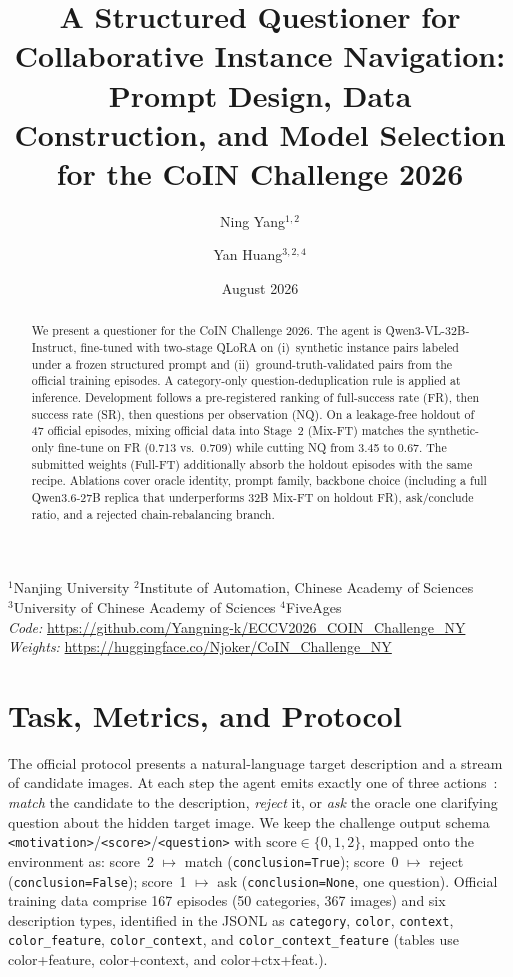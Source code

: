 \documentclass[10pt,a4paper]{article}
\title{A Structured Questioner for Collaborative Instance Navigation:\\
Prompt Design, Data Construction, and Model Selection\\
for the CoIN Challenge 2026}
\author{Ning Yang$^{1,2}$ \and Yan Huang$^{3,2,4}$}
\date{August 2026}
\begin{document}
\maketitle
\begin{center}
{\small
$^{1}$Nanjing University \quad
$^{2}$Institute of Automation, Chinese Academy of Sciences\\
$^{3}$University of Chinese Academy of Sciences \quad
$^{4}$FiveAges}\\[0.45em]
\textit{Code:}
\url{https://github.com/Yangning-k/ECCV2026_COIN_Challenge_NY}\\[0.12em]
\textit{Weights:}
\url{https://huggingface.co/Njoker/CoIN_Challenge_NY}
\end{center}

\begin{abstract}
We present a questioner for the CoIN Challenge 2026. The agent is
Qwen3-VL-32B-Instruct, fine-tuned with two-stage QLoRA on (i)~synthetic
instance pairs labeled under a frozen structured prompt and
(ii)~ground-truth-validated pairs from the official training episodes.
A category-only question-deduplication rule is applied at inference.
Development follows a pre-registered ranking of full-success rate (FR),
then success rate (SR), then questions per observation (NQ). On a
leakage-free holdout of 47 official episodes, mixing official data into
Stage~2 (Mix-FT) matches the synthetic-only fine-tune on FR
(0.713 vs.\ 0.709) while cutting NQ from 3.45 to 0.67. The submitted
weights (Full-FT) additionally absorb the holdout episodes with the
same recipe. Ablations cover oracle identity, prompt family, backbone
choice (including a full Qwen3.6-27B replica that underperforms 32B
Mix-FT on holdout FR), ask/conclude ratio, and a rejected
chain-rebalancing branch.
\end{abstract}

\section{Task, Metrics, and Protocol}

The official protocol presents a natural-language target description and a
stream of candidate images. At each step the agent emits exactly one of
three actions~\cite{zorzi2026coinqa,taioli2025coin}: \emph{match} the
candidate to the description, \emph{reject} it, or \emph{ask} the oracle
one clarifying question about the hidden target image. We keep the
challenge output schema
\texttt{<motivation>}/\texttt{<score>}/\texttt{<question>} with
$\mathrm{score}\in\{0,1,2\}$, mapped onto the environment as:
score~2 $\mapsto$ match (\texttt{conclusion=True});
score~0 $\mapsto$ reject (\texttt{conclusion=False});
score~1 $\mapsto$ ask (\texttt{conclusion=None}, one question).
Official training data comprise 167 episodes (50 categories, 367 images)
and six description types, identified in the JSONL as
\texttt{category}, \texttt{color}, \texttt{context},
\texttt{color\_feature}, \texttt{color\_context}, and
\texttt{color\_context\_feature} (tables use color+feature, color+context,
and color+ctx+feat.).
\end{document}
